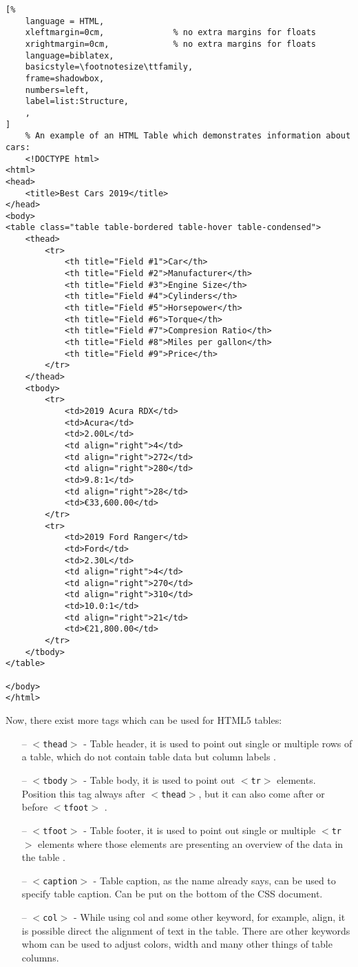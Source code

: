 \begin{lstlisting}[%
    language = HTML,
    xleftmargin=0cm,              % no extra margins for floats
    xrightmargin=0cm,             % no extra margins for floats
    language=biblatex,
    basicstyle=\footnotesize\ttfamily,
    frame=shadowbox,
    numbers=left,
    label=list:Structure,
    ,
]
    % An example of an HTML Table which demonstrates information about cars:
    <!DOCTYPE html>
<html>
<head>
	<title>Best Cars 2019</title>
</head>
<body>
<table class="table table-bordered table-hover table-condensed">
	<thead>
		<tr>
			<th title="Field #1">Car</th>
			<th title="Field #2">Manufacturer</th>
			<th title="Field #3">Engine Size</th>
			<th title="Field #4">Cylinders</th>
			<th title="Field #5">Horsepower</th>
			<th title="Field #6">Torque</th>
			<th title="Field #7">Compresion Ratio</th>
			<th title="Field #8">Miles per gallon</th>
			<th title="Field #9">Price</th>
		</tr>
	</thead>
	<tbody>
		<tr>
			<td>2019 Acura RDX</td>
			<td>Acura</td>
			<td>2.00L</td>
			<td align="right">4</td>
			<td align="right">272</td>
			<td align="right">280</td>
			<td>9.8:1</td>
			<td align="right">28</td>
			<td>€33,600.00</td>
		</tr>
		<tr>
			<td>2019 Ford Ranger</td>
			<td>Ford</td>
			<td>2.30L</td>
			<td align="right">4</td>
			<td align="right">270</td>
			<td align="right">310</td>
			<td>10.0:1</td>
			<td align="right">21</td>
			<td>€21,800.00</td>
		</tr>
	</tbody>
</table>

</body>
</html>

\end{lstlisting}

Now, there exist more tags which can be used for HTML5 tables:
\begin{itemize}
    \item[--] $<$\texttt{thead}$>$ - Table header, it is used to point out single or multiple rows
of a table, which do not contain table data but column labels \parencite{ChrisCoyier}.

    \item[--] $<$\texttt{tbody}$>$ - Table body, it is used to point out $<$\texttt{tr}$>$ elements. Position this tag
always after $<$\texttt{thead}$>$, but it can also come after or before $<$\texttt{tfoot}$>$ \parencite{ChrisCoyier}.

    \item[--] $<$\texttt{tfoot}$>$ - Table footer, it is used to point out single or multiple $<$\texttt{tr}$>$ elements
where those elements are presenting an overview  of the data in the table \parencite{ChrisCoyier}.

    \item[--] $<$\texttt{caption}$>$ - Table caption, as the name already says, can be used to specify table caption.
Can be put on the bottom of the CSS document.

    \item[--] $<$\texttt{col}$>$ - While using col and some other keyword, for example, align, it is possible direct
the alignment of text in the table. There are other keywords whom can be used to adjust colors, width
and many other things of table columns.
\end{itemize}
